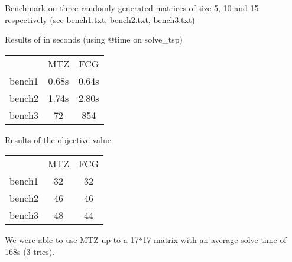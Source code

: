 Benchmark on three randomly-generated matrices of size 5, 10 and 15 respectively\newline
(see bench1.txt, bench2.txt, bench3.txt)

\bigbreak
Results of in seconds (using @time on solve\_tsp)\newline
\begin{tabular}{|c|c|c|}
\ & MTZ & FCG \\
bench1 & 0.68s & 0.64s \\
bench2 & 1.74s & 2.80s \\
bench3 & 72 & 854 \\
\end{tabular}

\bigbreak

Results of the objective value\newline
\begin{tabular}{|c|c|c|}
\ & MTZ & FCG \\
bench1 & 32 & 32 \\
bench2 & 46 & 46 \\
bench3 & 48 & 44 \\
\end{tabular}
\bigbreak
We were able to use MTZ up to a 17*17 matrix with an average solve time of 168s (3 tries).
